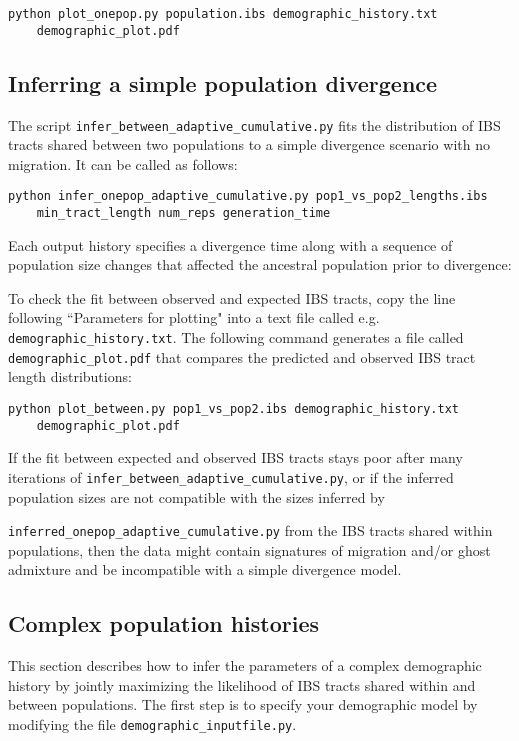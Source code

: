 \documentclass[12pt]{article}
\begin{document}
\begin{Verbatim}
python plot_onepop.py population.ibs demographic_history.txt 
	demographic_plot.pdf
\end{Verbatim}

\subsection{Inferring a simple population divergence}

The script \verb|infer_between_adaptive_cumulative.py| fits the distribution of IBS tracts shared between two populations to a simple divergence scenario with no migration. It can be called as follows:

\begin{Verbatim}
python infer_onepop_adaptive_cumulative.py pop1_vs_pop2_lengths.ibs 
	min_tract_length num_reps generation_time
\end{Verbatim}

Each output history specifies a divergence time along with a sequence of population size changes that affected the ancestral population prior to divergence:

To check the fit between observed and expected IBS tracts, copy the line following ``Parameters for plotting" into a text file called e.g. \verb|demographic_history.txt|. The following command generates a file called \verb|demographic_plot.pdf| that compares the predicted and observed IBS tract length distributions:

\begin{Verbatim}
python plot_between.py pop1_vs_pop2.ibs demographic_history.txt 
	demographic_plot.pdf
\end{Verbatim}

If the fit between expected and observed IBS tracts stays poor after many iterations of \verb|infer_between_adaptive_cumulative.py|, or if the inferred population sizes are not compatible with the sizes inferred by 

\noindent \verb|inferred_onepop_adaptive_cumulative.py| from the IBS tracts shared within populations, then the data might contain signatures of migration and/or ghost admixture and be incompatible with a simple divergence model.

\subsection{Complex population histories} 

This section describes how to infer the parameters of a complex demographic history by jointly maximizing the likelihood of IBS tracts shared within and between populations. The first step is to specify your demographic model by modifying the file \verb|demographic_inputfile.py|. 
\end{document}
